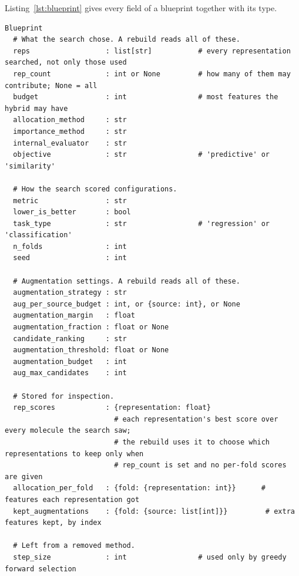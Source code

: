 Listing~\ref{lst:blueprint} gives every field of a blueprint together with its type.
\begin{lstlisting}[float=htbp, breaklines=true, basicstyle=\scriptsize\ttfamily, columns=fullflexible, keepspaces=true, frame=single, caption={Fields of a blueprint and their types. Comment lines group the fields, and each field is given with its type and, where needed, a comment on its meaning.}, label=lst:blueprint, captionpos=b]
Blueprint
  # What the search chose. A rebuild reads all of these.
  reps                  : list[str]           # every representation searched, not only those used
  rep_count             : int or None         # how many of them may contribute; None = all
  budget                : int                 # most features the hybrid may have
  allocation_method     : str
  importance_method     : str
  internal_evaluator    : str
  objective             : str                 # 'predictive' or 'similarity'

  # How the search scored configurations.
  metric                : str
  lower_is_better       : bool
  task_type             : str                 # 'regression' or 'classification'
  n_folds               : int
  seed                  : int

  # Augmentation settings. A rebuild reads all of these.
  augmentation_strategy : str
  aug_per_source_budget : int, or {source: int}, or None
  augmentation_margin   : float
  augmentation_fraction : float or None
  candidate_ranking     : str
  augmentation_threshold: float or None
  augmentation_budget   : int
  aug_max_candidates    : int

  # Stored for inspection.
  rep_scores            : {representation: float}
                          # each representation's best score over every molecule the search saw;
                          # the rebuild uses it to choose which representations to keep only when
                          # rep_count is set and no per-fold scores are given
  allocation_per_fold   : {fold: {representation: int}}      # features each representation got
  kept_augmentations    : {fold: {source: list[int]}}         # extra features kept, by index

  # Left from a removed method.
  step_size             : int                 # used only by greedy forward selection
\end{lstlisting}


